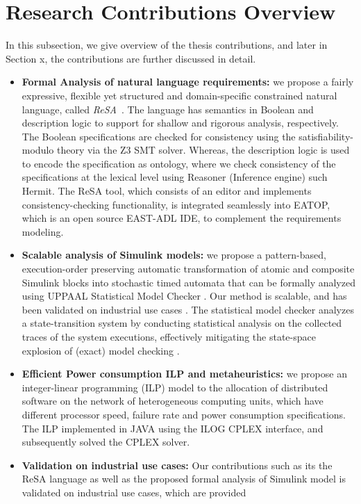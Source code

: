 \section{Research Contributions Overview}
In this subsection, we give overview of the thesis contributions, and later in Section x, the contributions are further discussed in detail.
\begin{itemize}
\item \textbf{Formal Analysis of natural language requirements:}  we propose a fairly expressive, flexible yet structured and domain-specific constrained natural language, called \textit{ReSA}~\cite{resatool}\cite{Mahmud2015ReSA:Systems}. The language has semantics in Boolean and description logic to support for shallow and rigorous analysis, respectively. The Boolean specifications are checked for consistency using the satisfiability-modulo theory via the Z3 SMT solver. Whereas, the description logic is used to encode the specification as ontology, where we check consistency of the specifications at the lexical level using Reasoner (Inference engine) such Hermit. The ReSA tool, which consists of an editor and implements consistency-checking functionality, is integrated seamlessly into EATOP, which is an open source EAST-ADL IDE, to complement the requirements modeling. 

\item \textbf{Scalable analysis of Simulink models:} we propose a pattern-based, execution-order preserving automatic transformation of atomic and composite Simulink blocks into stochastic timed automata that can be formally analyzed using UPPAAL Statistical Model Checker \cite{Bulychev2012UPPAAL-SMC:Automata}. Our method is scalable, and has been validated on industrial use cases \cite{Filipovikj2016SimulinkSystems}. The statistical model checker analyzes a state-transition system by conducting statistical analysis on the collected traces of the system executions, effectively mitigating the state-space explosion of (exact) model checking \cite{Legay2010StatisticalOverview}. 

\item \textbf{Efficient Power consumption ILP and metaheuristics:} we propose an integer-linear programming (ILP) model to the allocation of distributed software on the network of heterogeneous computing units, which have different processor speed, failure rate and power consumption specifications. The ILP implemented in JAVA using the ILOG CPLEX interface, and subsequently solved the CPLEX solver.
\item \textbf{Validation on industrial use cases: } 
Our contributions such as its the ReSA language as well as the proposed formal analysis of Simulink model is validated on industrial use cases, which are provided
\end{itemize}
